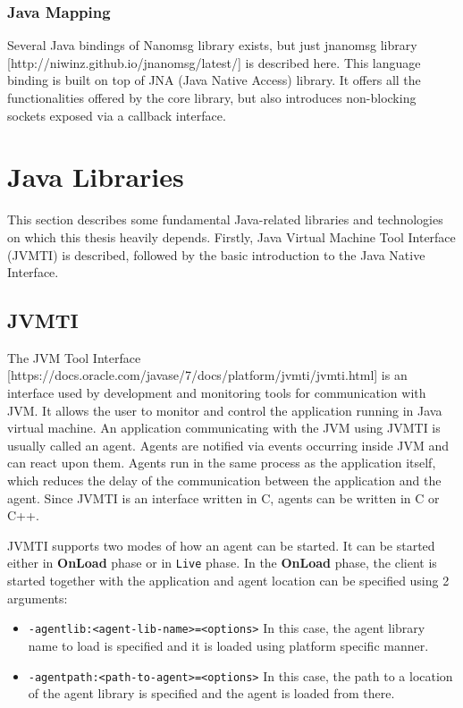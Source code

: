 \subsubsection{Java Mapping}
Several Java bindings of Nanomsg library exists, but just jnanomsg library [http://niwinz.github.io/jnanomsg/latest/] is described here. This language binding is built on top of JNA (Java Native Access) library. It offers all the functionalities offered by the core library, but also introduces non-blocking sockets exposed via a callback interface.

\section{Java Libraries}
This section describes some fundamental Java-related libraries and technologies on which this thesis heavily depends. Firstly, Java Virtual Machine Tool Interface (JVMTI) is described, followed by the basic introduction to the Java Native Interface.
\subsection{JVMTI}
\label{JVMTI}
The JVM Tool Interface [https://docs.oracle.com/javase/7/docs/platform/jvmti/jvmti.html] is an interface used by development and monitoring tools for communication with JVM. It allows the user to monitor and control the application running in Java virtual machine. An application communicating with the JVM using JVMTI is usually called an agent. Agents are notified via events occurring inside JVM and can react upon them. Agents run in the same process as the application itself, which reduces the delay of the communication between the application and the agent. Since JVMTI is an interface written in C, agents can be written in C or C++. 

JVMTI supports two modes of how an agent can be started. It can be started either in \textbf{OnLoad} phase or in \texttt{Live} phase. In the \textbf{OnLoad} phase, the client is started together with the application and agent location can be specified using 2 arguments:
\begin{itemize}
	\item \texttt{-agentlib:<agent-lib-name>=<options>} \newline
	In this case, the agent library name to load is specified and it is loaded using platform specific manner.
	\item \texttt{-agentpath:<path-to-agent>=<options>} \newline
	In this case, the path to a location of the agent library is specified and the agent is loaded from there.
\end{itemize}

